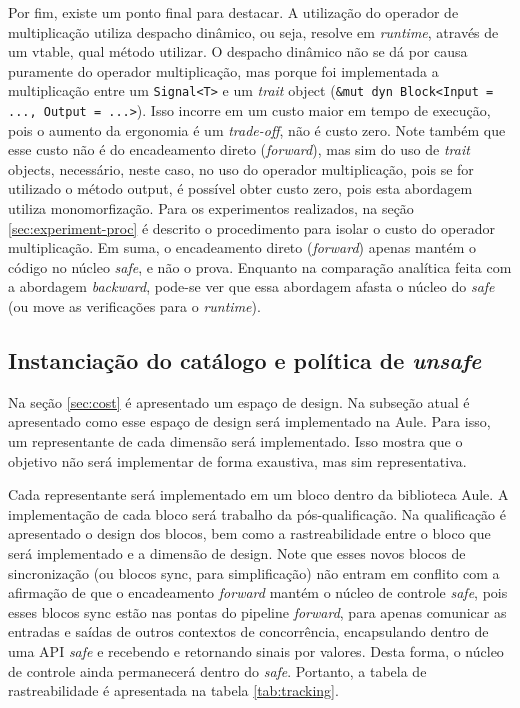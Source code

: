 Por fim, existe um ponto final para destacar. A utilização do operador de multiplicação utiliza despacho dinâmico, ou seja, resolve em \textit{runtime}, através de um vtable, qual método utilizar. O despacho dinâmico não se dá por causa puramente do operador multiplicação, mas porque foi implementada a multiplicação entre um \texttt{Signal<T>} e um \textit{trait} object (\texttt{\&mut dyn Block<Input = ..., Output = ...>}). Isso incorre em um custo maior em tempo de execução, pois o aumento da ergonomia é um \textit{trade-off}, não é custo zero. Note também que esse custo não é do encadeamento direto (\textit{forward}), mas sim do uso de \textit{trait} objects, necessário, neste caso, no uso do operador multiplicação, pois se for utilizado o método output, é possível obter custo zero, pois esta abordagem utiliza monomorfização. Para os experimentos realizados, na seção \ref{sec:experiment-proc} é descrito o procedimento para isolar o custo do operador multiplicação. Em suma, o encadeamento direto (\textit{forward}) apenas mantém o código no núcleo \textit{safe}, e não o prova. Enquanto na comparação analítica feita com a abordagem \textit{backward}, pode-se ver que essa abordagem afasta o núcleo do \textit{safe} (ou move as verificações para o \textit{runtime}).

\subsection{Instanciação do catálogo e política de \textit{unsafe}}
\label{subsec:catalog-n-unsafe-policy}

Na seção \ref{sec:cost} é apresentado um espaço de design. Na subseção atual é apresentado como esse espaço de design será implementado na Aule. Para isso, um representante de cada dimensão será implementado. Isso mostra que o objetivo não será implementar de forma exaustiva, mas sim representativa.

Cada representante será implementado em um bloco dentro da biblioteca Aule. A implementação de cada bloco será trabalho da pós-qualificação. Na qualificação é apresentado o design dos blocos, bem como a rastreabilidade entre o bloco que será implementado e a dimensão de design. Note que esses novos blocos de sincronização (ou blocos sync, para simplificação) não entram em conflito com a afirmação de que o encadeamento \textit{forward} mantém o núcleo de controle \textit{safe}, pois esses blocos sync estão nas pontas do pipeline \textit{forward}, para apenas comunicar as entradas e saídas de outros contextos de concorrência, encapsulando dentro de uma \ac{API} \textit{safe} e recebendo e retornando sinais por valores. Desta forma, o núcleo de controle ainda permanecerá dentro do \textit{safe}. Portanto, a tabela de rastreabilidade é apresentada na tabela \ref{tab:tracking}.

